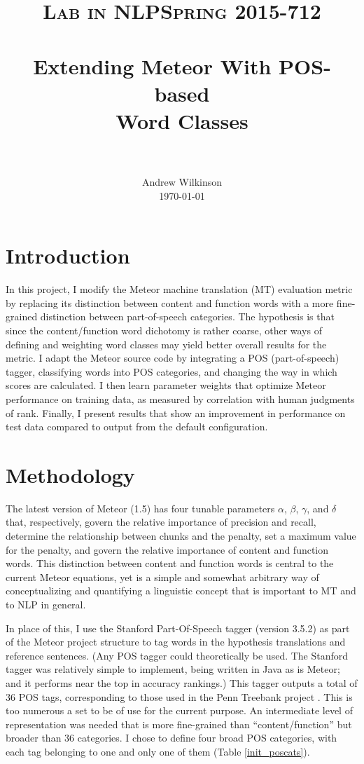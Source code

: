 \documentclass[paper=a4, fontsize=11pt]{scrartcl}
\title{
		\usefont{OT1}{bch}{b}{n}
		\normalfont \normalsize \textsc{Lab in NLP\textemdash Spring 2015\textemdash 11-712} \\ [25pt]
		\horrule{0.5pt} \\[0.4cm]
		\huge Extending Meteor With POS-based \\ Word Classes \\
		\horrule{2pt} \\[0.5cm]
}
\author{
		\normalfont 								\normalsize
        Andrew Wilkinson\\[-3pt]		\normalsize
        \today
}
\date{}
\numberwithin{equation}{section}		%
\numberwithin{figure}{section}			%
\numberwithin{table}{section}				%
\begin{document}
\maketitle
\section{Introduction}

In this project, I modify the Meteor machine translation (MT) evaluation metric by replacing its distinction between content and function words with a more fine-grained distinction between part-of-speech categories.  The hypothesis is that since the content/function word dichotomy is rather coarse, other ways of defining and weighting word classes may yield better overall results for the metric.  I adapt the Meteor source code by integrating a POS (part-of-speech) tagger, classifying words into POS categories, and changing the way in which scores are calculated.  I then learn parameter weights that optimize Meteor performance on training data, as measured by correlation with human judgments of rank.  Finally, I present results that show an improvement in performance on test data compared to output from the default configuration.

\section{Methodology}

The latest version of Meteor (1.5) \cite{meteor1.5} has four tunable parameters $\alpha$, $\beta$, $\gamma$, and $\delta$ that, respectively, govern the relative importance of precision and recall, determine the relationship between chunks and the penalty, set a maximum value for the penalty, and govern the relative importance of content and function words.  This distinction between content and function words is central to the current Meteor equations, yet is a simple and somewhat arbitrary way of conceptualizing and quantifying a linguistic concept that is important to MT and to NLP in general.

In place of this, I use the Stanford Part-Of-Speech tagger (version 3.5.2) \cite{stanfordpos} as part of the Meteor project structure to tag words in the hypothesis translations and reference sentences.  (Any POS tagger could theoretically be used.  The Stanford tagger was relatively simple to implement, being written in Java as is Meteor; and it performs near the top in accuracy rankings.)  This tagger outputs a total of 36 POS tags, corresponding to those used in the Penn Treebank project \cite{treebank}.  This is too numerous a set to be of use for the current purpose.  An intermediate level of representation was needed that is more fine-grained than ``content/function'' but broader than 36 categories.  I chose to define four broad POS categories, with each tag belonging to one and only one of them (Table \ref{init_poscats}).
\end{document}
